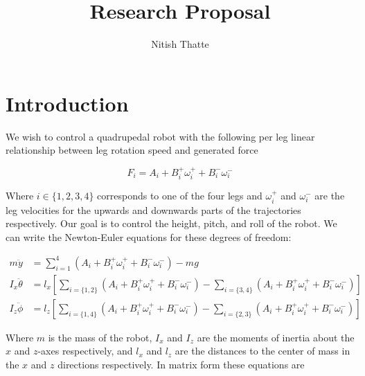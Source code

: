 \documentclass{article}
\title{Research Proposal}
\author{Nitish Thatte}
\begin{document}
\maketitle

\section*{Introduction}


We wish to control a quadrupedal robot with the following per leg linear relationship between leg rotation speed and generated force

\begin{equation}
	F_i = A_i + B_i^+ \omega_i^+ + B_i^- \omega_i^-
\end{equation}

Where $i \in \{1,2,3,4\}$ corresponds to one of the four legs and $\omega_i^+$ and $\omega_i^-$ are the leg velocities for the upwards and downwards parts of the trajectories respectively. Our goal is to control the height, pitch, and roll of the robot. We can write the Newton-Euler equations for these degrees of freedom:

\begin{align}
	m \ddot{y} &= \sum_{i=1}^4 (A_i + B_i^+ \omega_i^+ + B_i^- \omega_i^-) - mg \\
	I_x \ddot{\theta} &= l_x \left[ \sum_{i = \{1,2\}} \left(A_i + B_i^+ \omega_i^+ + B_i^- \omega_i^- \right) - \sum_{i = \{3,4\}} \left(A_i + B_i^+ \omega_i^+ + B_i^- \omega_i^- \right) \right] \\
	I_z \ddot{\phi} &= l_z \left[ \sum_{i = \{1,4\}} \left(A_i + B_i^+ \omega_i^+ + B_i^- \omega_i^- \right) - \sum_{i = \{2,3\}} \left(A_i + B_i^+ \omega_i^+ + B_i^- \omega_i^- \right) \right]
\end{align}

Where $m$ is the mass of the robot, $I_x$ and $I_z$ are the moments of inertia about the $x$ and $z$-axes respectively, and $l_x$ and $l_z$ are the distances to the center of mass in the $x$ and $z$ directions respectively. In matrix form these equations are 
\end{document}
